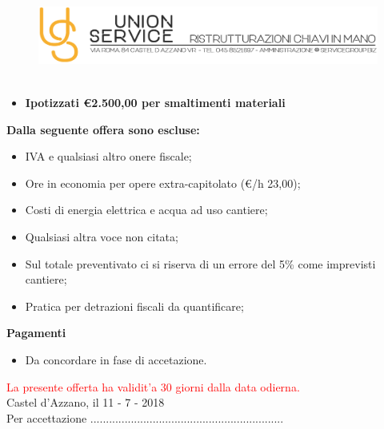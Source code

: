 \documentclass[a4paper]{article}
\begin{document}
                      \newpage
                    
                      \begin{figure}[!t]
                      \includegraphics[width=15.8cm, height=3cm]{intestazioneAlta2.jpg}
                      \end{figure}
                    
                      \begin{itemize}
                          \item \textbf{Ipotizzati \euro 2.500,00 per smaltimenti materiali}
                      \end{itemize}
                    
                      \noindent\textbf{Dalla seguente offera sono escluse:}
                      \begin{itemize}
                          \item IVA e qualsiasi altro onere fiscale;
                          \item Ore in economia per opere extra-capitolato (\euro/h 23,00);
                          \item Costi di energia elettrica e acqua ad uso cantiere;
                          \item Qualsiasi altra voce non citata;
                          \item Sul totale preventivato ci si riserva di un errore del 5\% come imprevisti cantiere;
                          \item Pratica per detrazioni fiscali da quantificare;
                      \end{itemize}
                    
                      \noindent\textbf{Pagamenti}
                      \begin{itemize}
                          \item Da concordare in fase di accetazione.
                      \end{itemize}
                      
                      \textcolor{red}{La presente offerta ha validit'a 30 giorni dalla data odierna.}\\
                      
                      Castel d'Azzano, il 11 - 7 - 2018
                      \vspace{1cm}\\
                      Per accettazione ..............................................................
                    
                    
\end{document}
